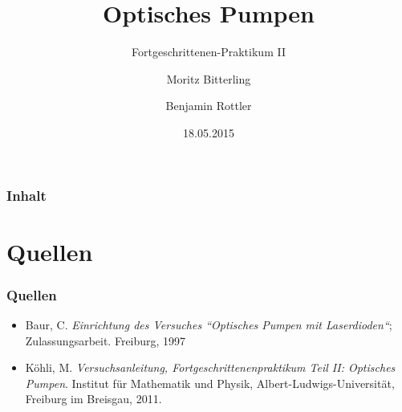 \documentclass{beamer}
\title{Optisches Pumpen}
\subtitle{Fortgeschrittenen-Praktikum II}
\author{Moritz Bitterling \and Benjamin Rottler}
\institute[Universities of]{Universität Freiburg}
\date{18.05.2015}
\begin{document}
\begin{frame}
\titlepage
\end{frame}

\begin{frame}
\frametitle{Inhalt}
\tableofcontents[hideallsubsections]
\end{frame}


%






\section*{Quellen}
\begin{frame}
\frametitle{Quellen}
  \begin{itemize}
  \item Baur, C. \emph{Einrichtung des Versuches “Optisches Pumpen mit Laserdioden“}; 
  Zulassungsarbeit. Freiburg, 1997
  \item Köhli, M. \emph{Versuchsanleitung, Fortgeschrittenenpraktikum Teil II: Optisches Pumpen}. 
  Institut für Mathematik und Physik, Albert-Ludwigs-Universität, Freiburg im Breisgau, 2011.
\end{itemize}
\end{frame}

\bgroup
{}
\begin{frame}[plain]{}
\end{frame}
\egroup
\end{document}
